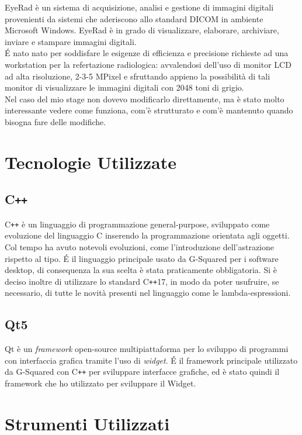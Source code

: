 EyeRad è un sistema di acquisizione, analisi e gestione di immagini digitali provenienti da sistemi che aderiscono allo standard DICOM in ambiente Microsoft Windows.
EyeRad è in grado di visualizzare, elaborare, archiviare, inviare e stampare immagini digitali.
\\
\'E nato nato per soddisfare le esigenze di efficienza e precisione richieste ad una workstation per la refertazione radiologica: avvalendosi dell’uso di monitor LCD ad alta risoluzione, 2-3-5 MPixel e sfruttando appieno la possibilità di tali monitor di visualizzare le immagini digitali con 2048 toni di grigio.
\\
Nel caso del mio stage non dovevo modificarlo direttamente, ma è stato molto interessante vedere come funziona, com'è strutturato e com'è mantenuto quando bisogna fare delle modifiche.

\section{Tecnologie Utilizzate}
\subsection{C\texttt{++}}\label{sec:C++}
C\texttt{++} è un linguaggio di programmazione general-purpose, sviluppato come evoluzione del linguaggio C inserendo la programmazione orientata agli oggetti. Col tempo ha avuto notevoli evoluzioni, come l'introduzione dell'astrazione rispetto al tipo. \'E il linguaggio principale usato da G-Squared per i software desktop, di consequenza la sua scelta è stata praticamente obbligatoria. Si è deciso inoltre di utilizzare lo standard C\texttt{++}17, in modo da poter usufruire, se necessario, di tutte le novità presenti nel linguaggio come le lambda-espressioni.

\subsection{Qt5}\label{sec:Qt5}
Qt è un \textit{framework} open-source multipiattaforma per lo sviluppo di programmi con interfaccia grafica tramite l'uso di \textit{widget}.
\'E il framework principale utilizzato da G-Squared con C\texttt{++} per sviluppare interfacce grafiche, ed è stato quindi il framework che ho utilizzato per sviluppare il Widget.

\newpage
\section{Strumenti Utilizzati}
